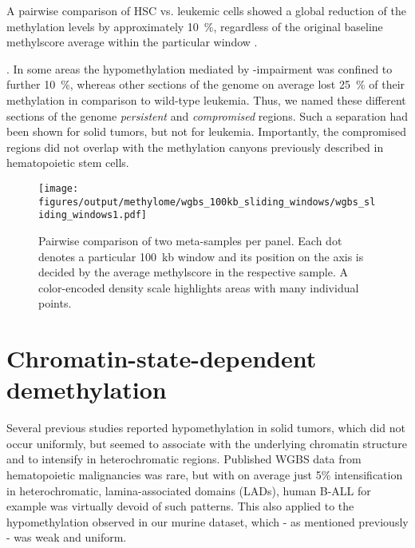 A pairwise comparison of \dnmtwt HSC vs. \kitpos leukemic cells showed a global reduction of the methylation levels by approximately \SI{10}{\percent}, regardless of the original baseline methylscore average within the particular window . 

 . In some areas the hypomethylation mediated by -impairment was confined to further \SI{10}{\percent}, whereas other sections of the genome on average lost \SI{25}{\percent} of their methylation in comparison to wild-type leukemia. Thus, we named these different sections of the genome \emph{persistent} and \emph{compromised} regions. Such a separation had been shown for solid tumors, but not for leukemia. Importantly, the compromised regions did not overlap with the methylation canyons  previously described in hematopoietic stem cells\cite{Jeong2014}\dns. 

\begin{figure}[!ht] 
	\centering
	\texttt{[image: figures/output/methylome/wgbs\_100kb\_sliding\_windows/wgbs\_sliding\_windows1.pdf]} 
	\caption[Scatterplot of pairwise comparisons for all CpGs]{Pairwise comparison of two meta-samples per panel. Each dot denotes a particular \SI{100}{\kilo b} window and its position on the axis is decided by the average methylscore in the respective sample. A color-encoded density scale highlights areas with many individual points.}
	\label{fig:wgbs_sliding_windows1}
\end{figure}

\section{Chromatin-state-dependent demethylation}
\label{chap:r:wgbs:lad_demethylation}

Several previous studies reported hypomethylation in solid tumors, which did not occur uniformly, but seemed to associate with the underlying chromatin structure and to intensify in heterochromatic regions\cite{Hansen2011,Berman2012,Hon2012,Timp2014}. Published WGBS data from hematopoietic malignancies was rare, but with on average just 5\% intensification in heterochromatic, lamina-associated domains (LADs), human B-ALL\cite{Lee2015a} for example was virtually devoid of such patterns. This also applied to the hypomethylation observed in our murine \dnmtwt \kitpos dataset, which - as mentioned previously - was weak and uniform.

